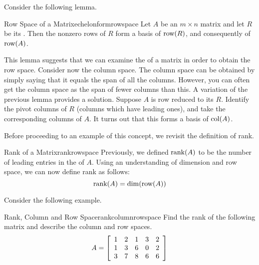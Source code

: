 Consider the following lemma. 

\begin{lemma}{Row Space of a {\EF} Matrix}{echelonformrowspace}
Let $A$ be an $m \times n$ matrix and let $R$ be its {\ef}. Then the nonzero rows of $R$ form a basis of $\mbox{row}(R)$, and consequently of $\mbox{row}(A)$. 
\end{lemma}

This lemma suggests that we can examine the {\ef} of a matrix in order to obtain the row space. Consider now the column space. The column space can be obtained by simply saying that
it equals the span of all the columns. However, you can often get the column
space as the span of fewer columns than this. A variation of the previous lemma provides a solution. Suppose $A$ is row reduced to its {\ef} $R$. Identify the pivot columns of $R$ (columns which have leading ones), and take the corresponding columns of $A$. It turns out that this forms a basis of $\mbox{col}(A)$. 

Before proceeding to an example of this concept, we revisit the definition of rank. 

\begin{definition}{Rank of a Matrix}{rankrowspace}
Previously, we defined $\mbox{rank}(A)$ to be the number of leading entries in the {\ef} of $A$. Using an understanding of dimension and row space, we can now define rank as follows:
\[
\mbox{rank}(A) = \dim(\mbox{row}(A))
\]
\end{definition}

Consider the following example. 

\begin{example}{Rank, Column and Row Space}{rankcolumnrowspace}
Find the rank of the following matrix and describe the column and row spaces.
\begin{equation*}
A = 
\left[
\begin{array}{rrrrr}
1 & 2 & 1 & 3 & 2 \\
1 & 3 & 6 & 0 & 2 \\
3 & 7 & 8 & 6 & 6
\end{array}
\right]  
\end{equation*}
\end{example}

